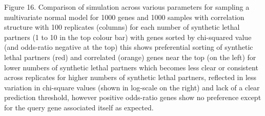 Figure 16.  Comparison of simulation across various parameters for sampling a multivariate normal model for 1000 genes and 1000 samples with correlation structure with 100 replicates (columns) for each number of \gls{synthetic lethal} partners (1 to 10 in the top colour bar) with genes sorted by chi-squared value (and odds-ratio negative at the top) this shows preferential sorting of \gls{synthetic lethal} partners (red) and correlated (orange) genes near the top (on the left) for lower numbers of \gls{synthetic lethal} partners which becomes less clear or consistent across replicates for higher numbers of \gls{synthetic lethal} partners, reflected in less variation in chi-square values (shown in log-scale on the right) and lack of a clear prediction threshold, however positive odds-ratio genes show no preference except for the query gene associated itself as expected.
\fi